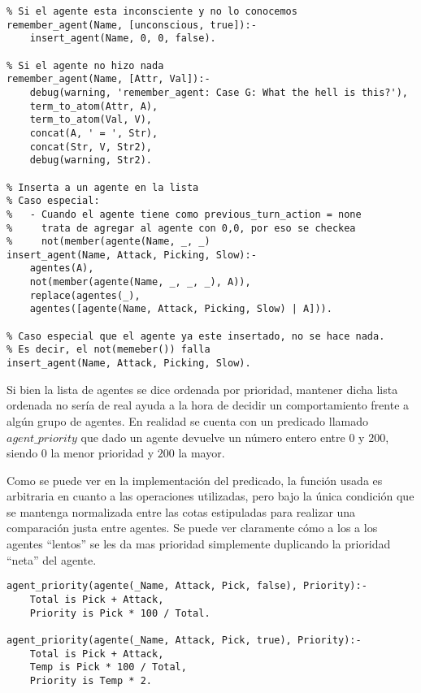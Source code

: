 \documentclass[a4paper,10pt,spanish]{article}
\begin{document}
\begin{lstlisting}
% Si el agente esta inconsciente y no lo conocemos
remember_agent(Name, [unconscious, true]):-
	insert_agent(Name, 0, 0, false).
	
% Si el agente no hizo nada
remember_agent(Name, [Attr, Val]):- 
	debug(warning, 'remember_agent: Case G: What the hell is this?'),
	term_to_atom(Attr, A),
	term_to_atom(Val, V),
	concat(A, ' = ', Str),
	concat(Str, V, Str2),
	debug(warning, Str2).

% Inserta a un agente en la lista
% Caso especial: 
%	- Cuando el agente tiene como previous_turn_action = none 
%     trata de agregar al agente con 0,0, por eso se checkea 
%     not(member(agente(Name, _, _)
insert_agent(Name, Attack, Picking, Slow):- 
	agentes(A), 
	not(member(agente(Name, _, _, _), A)), 
	replace(agentes(_), 
	agentes([agente(Name, Attack, Picking, Slow) | A])).

% Caso especial que el agente ya este insertado, no se hace nada.
% Es decir, el not(memeber()) falla
insert_agent(Name, Attack, Picking, Slow).
	\end{lstlisting}
	
	Si bien la lista de agentes se dice ordenada por prioridad, mantener dicha lista ordenada no ser\'ia de real ayuda a la hora de decidir un comportamiento frente a alg\'un grupo de agentes. En realidad se cuenta con un predicado llamado $agent\_priority$ que dado un agente devuelve un n\'umero entero entre $0$ y $200$, siendo $0$ la menor prioridad y $200$ la mayor.
	
	Como se puede ver en la implementaci\'on del predicado, la funci\'on usada es arbitraria en cuanto a las operaciones utilizadas, pero bajo la \'unica condici\'on que se mantenga normalizada entre las cotas estipuladas para realizar una comparaci\'on justa entre agentes. Se puede ver claramente c\'omo a los a los agentes ``lentos'' se les da mas prioridad simplemente duplicando la prioridad ``neta'' del agente.
	
	\begin{lstlisting}
agent_priority(agente(_Name, Attack, Pick, false), Priority):-
	Total is Pick + Attack,
	Priority is Pick * 100 / Total.

agent_priority(agente(_Name, Attack, Pick, true), Priority):-
	Total is Pick + Attack,
	Temp is Pick * 100 / Total,
	Priority is Temp * 2.
	\end{lstlisting}

	
\end{document}
